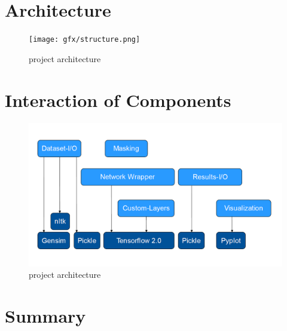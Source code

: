 \section{Architecture}
\begin{figure}[H]
	\centering
	\texttt{[image: gfx/structure.png]}
	\caption{project architecture}
	\label{fig:Architecture}
\end{figure}

\section{Interaction of Components}
\begin{figure}[H]
	\centering
	\includegraphics[width=450px]{gfx/structure2.png}
	\caption{project architecture}
	\label{fig:Interaction}
\end{figure}


\section{Summary}